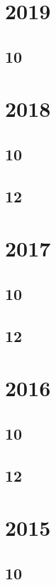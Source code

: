 \documentclass[11pt]{book}
\begin{document}
\section{2019}
\subsection{10}

\section{2018}
\subsection{10}


\subsection{12}




\section{2017}
\subsection{10}

\subsection{12}





\section{2016}
\subsection{10}

\subsection{12}

\section{2015}
\subsection{10}

\end{document}

